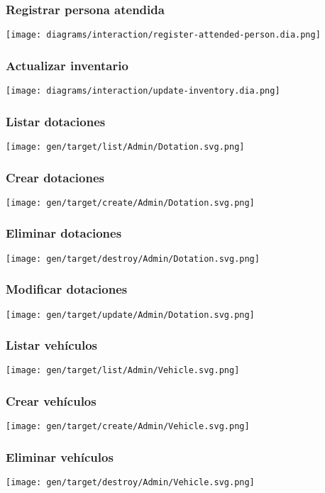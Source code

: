 \subsubsection{Registrar persona atendida}
\texttt{[image: diagrams/interaction/register-attended-person.dia.png]}

\subsubsection{Actualizar inventario}
\texttt{[image: diagrams/interaction/update-inventory.dia.png]}

\subsubsection{Listar dotaciones}
\texttt{[image: gen/target/list/Admin/Dotation.svg.png]}

\subsubsection{Crear dotaciones}
\texttt{[image: gen/target/create/Admin/Dotation.svg.png]}

\subsubsection{Eliminar dotaciones}
\texttt{[image: gen/target/destroy/Admin/Dotation.svg.png]}

\subsubsection{Modificar dotaciones}
\texttt{[image: gen/target/update/Admin/Dotation.svg.png]}

\subsubsection{Listar vehículos}
\texttt{[image: gen/target/list/Admin/Vehicle.svg.png]}

\subsubsection{Crear vehículos}
\texttt{[image: gen/target/create/Admin/Vehicle.svg.png]}

\subsubsection{Eliminar vehículos}
\texttt{[image: gen/target/destroy/Admin/Vehicle.svg.png]}

